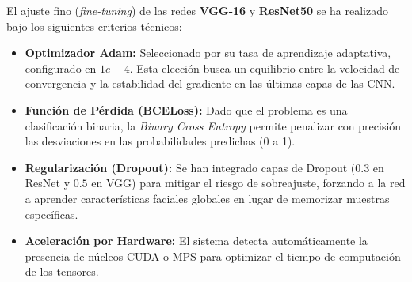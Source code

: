 El ajuste fino (\textit{fine-tuning}) de las redes \textbf{VGG-16} y \textbf{ResNet50} se ha realizado bajo los siguientes criterios técnicos:

\begin{itemize}
    \item \textbf{Optimizador Adam:} Seleccionado por su tasa de aprendizaje adaptativa, configurado en $1e-4$. Esta elección busca un equilibrio entre la velocidad de convergencia y la estabilidad del gradiente en las últimas capas de las CNN.
    \item \textbf{Función de Pérdida (BCELoss):} Dado que el problema es una clasificación binaria, la \textit{Binary Cross Entropy} permite penalizar con precisión las desviaciones en las probabilidades predichas (0 a 1).
    \item \textbf{Regularización (Dropout):} Se han integrado capas de Dropout ($0.3$ en ResNet y $0.5$ en VGG) para mitigar el riesgo de sobreajuste, forzando a la red a aprender características faciales globales en lugar de memorizar muestras específicas.
    \item \textbf{Aceleración por Hardware:} El sistema detecta automáticamente la presencia de núcleos CUDA o MPS para optimizar el tiempo de computación de los tensores.
\end{itemize}